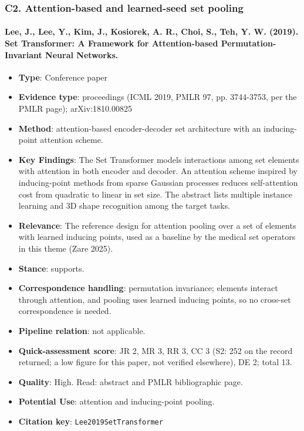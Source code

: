 \documentclass[journal,onecolumn]{IEEEtran}
\begin{document}
\subsubsection{C2. Attention-based and learned-seed set pooling}

\paragraph{Lee, J., Lee, Y., Kim, J., Kosiorek, A. R., Choi, S., Teh, Y. W. (2019). Set Transformer: A Framework for Attention-based Permutation-Invariant Neural Networks.~\cite{Lee2019SetTransformer}}\mbox{}

\begin{itemize}

\item{} \textbf{Type}: Conference paper

\item{} \textbf{Evidence type}: proceedings (ICML 2019, PMLR 97, pp. 3744-3753, per the PMLR page); arXiv:1810.00825

\item{} \textbf{Method}: attention-based encoder-decoder set architecture with an inducing-point attention scheme.

\item{} \textbf{Key Findings}: The Set Transformer models interactions among set elements with attention in both encoder and decoder. An attention scheme inspired by inducing-point methods from sparse Gaussian processes reduces self-attention cost from quadratic to linear in set size. The abstract lists multiple instance learning and 3D shape recognition among the target tasks.

\item{} \textbf{Relevance}: The reference design for attention pooling over a set of elements with learned inducing points, used as a baseline by the medical set operators in this theme (Zare 2025).

\item{} \textbf{Stance}: supports.

\item{} \textbf{Correspondence handling}: permutation invariance; elements interact through attention, and pooling uses learned inducing points, so no cross-set correspondence is needed.

\item{} \textbf{Pipeline relation}: not applicable.

\item{} \textbf{Quick-assessment score}: JR 2, MR 3, RR 3, CC 3 (S2: 252 on the record returned; a low figure for this paper, not verified elsewhere), DE 2; total 13.

\item{} \textbf{Quality}: High. Read: abstract and PMLR bibliographic page.

\item{} \textbf{Potential Use}: attention and inducing-point pooling.

\item{} \textbf{Citation key}: \texttt{Lee2019SetTransformer}

\end{itemize}
\end{document}
